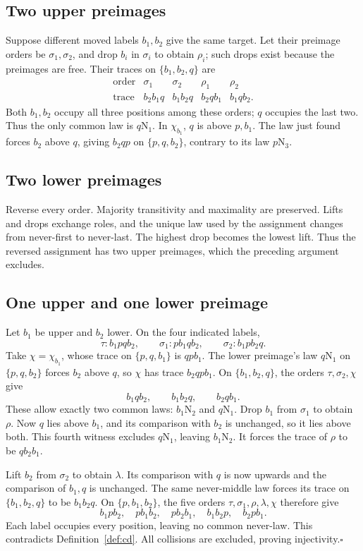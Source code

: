 \documentclass[11pt,letterpaper]{article}
\theoremstyle{definition}
\newcommand{\N}[2]{#1\mathrm N_{#2}}
\begin{document}
\subsection*{Two upper preimages}
Suppose different moved labels \(b_1,b_2\) give the same target.
Let their preimage orders be \(\sigma_1,\sigma_2\), and drop
\(b_i\) in \(\sigma_i\) to obtain \(\rho_i\); such drops exist
because the preimages are free. Their traces on \(\{b_1,b_2,q\}\) are
\[
\begin{array}{c|cccc}
 \text{order}&\sigma_1&\sigma_2&\rho_1&\rho_2\\\hline
 \text{trace}&b_2b_1q&b_1b_2q&b_2qb_1&b_1qb_2.
\end{array}
\]
Both \(b_1,b_2\) occupy all three positions among these orders;
\(q\) occupies the last two. Thus the only common law is \(\N q1\).
In \(\chi_{b_1}\), \(q\) is above \(p,b_1\). The law just
found forces \(b_2\) above \(q\), giving \(b_2qp\) on
\(\{p,q,b_2\}\), contrary to its law \(\N p3\).

\subsection*{Two lower preimages}
Reverse every order. Majority transitivity and maximality are preserved.
Lifts and drops exchange roles, and the unique law used by the assignment
changes from never-first to never-last. The highest drop becomes the
lowest lift. Thus the reversed assignment has two upper preimages,
which the preceding argument excludes.

\subsection*{One upper and one lower preimage}
Let \(b_1\) be upper and \(b_2\) lower. On the four indicated labels,
\[
 \tau:b_1pqb_2,\qquad
 \sigma_1:pb_1qb_2,\qquad
 \sigma_2:b_1pb_2q.
\]
Take \(\chi=\chi_{b_1}\), whose trace on \(\{p,q,b_1\}\) is
\(qpb_1\). The lower preimage's law \(\N q1\) on
\(\{p,q,b_2\}\) forces \(b_2\) above \(q\), so \(\chi\)
has trace \(b_2qpb_1\). On \(\{b_1,b_2,q\}\), the orders
\(\tau,\sigma_2,\chi\) give
\[
 b_1qb_2,\qquad b_1b_2q,\qquad b_2qb_1.
\]
These allow exactly two common laws: \(\N{b_1}2\) and \(\N q1\).
Drop \(b_1\) from \(\sigma_1\) to obtain \(\rho\).
Now \(q\) lies above \(b_1\), and its comparison with \(b_2\)
is unchanged, so it lies above both. This fourth witness excludes
\(\N q1\), leaving \(\N{b_1}2\). It forces the trace of
\(\rho\) to be \(qb_2b_1\).

Lift \(b_2\) from \(\sigma_2\) to obtain \(\lambda\). Its
comparison with \(q\) is now upwards and the comparison of
\(b_1,q\) is unchanged. The same never-middle law forces its trace
on \(\{b_1,b_2,q\}\) to be \(b_1b_2q\).
On \(\{p,b_1,b_2\}\), the five orders
\(\tau,\sigma_1,\rho,\lambda,\chi\) therefore give
\[
 b_1pb_2,\quad pb_1b_2,\quad pb_2b_1,\quad
 b_1b_2p,\quad b_2pb_1.
\]
Each label occupies every position, leaving no common never-law.
This contradicts Definition~\ref{def:cd}. All collisions are
excluded, proving injectivity.\hfill\(\square\)
\end{document}
